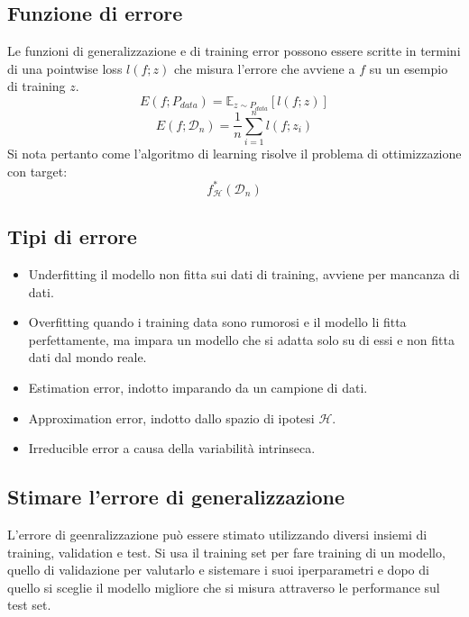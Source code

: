 	\subsection{Funzione di errore}
	Le funzioni di generalizzazione e di training error possono essere scritte in termini di una pointwise loss $l(f;z)$ che misura l'errore che avviene a $f$ su un esempio di training $z$.
	$$E(f;P_{data})=\mathbb{E}_{z\sim P_{data}}[l(f;z)]$$
	$$E(f;\mathcal{D}_n)=\dfrac{1}{n}\sum\limits_{i=1}^nl(f;z_i)$$
	Si nota pertanto come l'algoritmo di learning risolve il problema di ottimizzazione con target:
	$$f^*_\mathcal{H}(\mathcal{D}_n)$$

	\subsection{Tipi di errore}
	\begin{multicols}{2}
		\begin{itemize}
			\item Underfitting il modello non fitta sui dati di training, avviene per mancanza di dati.
			\item Overfitting quando i training data sono rumorosi e il modello li fitta perfettamente, ma impara un modello che si adatta solo su di essi e non fitta dati dal mondo reale.
			\item Estimation error, indotto imparando da un campione di dati.
			\item Approximation error, indotto dallo spazio di ipotesi $\mathcal{H}$.
			\item Irreducible error a causa della variabilit\`a intrinseca.
		\end{itemize}
	\end{multicols}

	\subsection{Stimare l'errore di generalizzazione}
	L'errore di geenralizzazione pu\`o essere stimato utilizzando diversi insiemi di training, validation e test.
	Si usa il training set per fare training di un modello, quello di validazione per valutarlo e sistemare i suoi iperparametri e dopo di quello si sceglie il modello migliore che si misura attraverso le performance sul test set.

